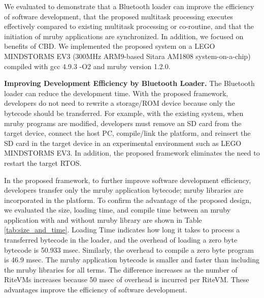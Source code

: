 \documentclass[conference]{IEEEtran/IEEEtran/IEEEtran}
\begin{document}
We evaluated to demonstrate that a Bluetooth loader can improve the efficiency of software development, that the proposed multitask processing executes effectively compared to existing multitask processing or co-routine, and that the initiation of mruby applications are synchronized.
In addition, we focused on benefits of CBD.
We implemented the proposed system on a LEGO MINDSTORMS EV3 \cite{par:EV3} (300MHz ARM9-based Sitara AM1808 system-on-a-chip) compiled with gcc 4.9.3 -O2 and mruby version 1.2.0.

{\bf Improving Development Efficiency by Bluetooth Loader.}
The Bluetooth loader can reduce the development time.
With the proposed framework, developers do not need to rewrite a storage/ROM device because only the bytecode should be transferred.
For example, with the existing system, when mruby programs are modified, developers must remove an SD card from the target device, connect the host PC, compile/link the platform, and reinsert the SD card in the target device in an experimental environment such as LEGO MINDSTORMS EV3.
In addition, the proposed framework eliminates the need to restart the target RTOS.

In the proposed framework, to further improve software development efficiency, developers transfer only the mruby application bytecode; mruby libraries are incorporated in the platform.
To confirm the advantage of the proposed design, we evaluated the size, loading time, and compile time between an mruby application with and without mruby library are shown in Table \ref{tab:size_and_time}.
Loading Time indicates how long it takes to process a transferred bytecode in the loader, and the overhead of loading a zero byte bytecode is 50.933 msec.
Similarly, the overhead to compile a zero byte program is 46.9 msec.
The mruby application bytecode is smaller and faster than including the mruby libraries for all terms.
The difference increases as the number of RiteVMs increases because 50 msec of overhead is incurred per RiteVM. 
These advantages improve the efficiency of software development.
\end{document}
